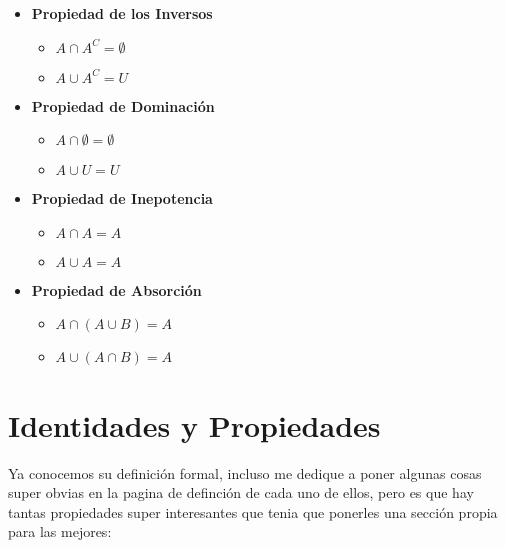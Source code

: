 \documentclass[12pt]{report}                                    %
\begin{document}
\begin{itemize}
                \item \textbf{Propiedad de los Inversos}
                    \begin{itemize}
                        \item $A \cap A^C = \emptyset$
                        \item $A \cup A^C = U$
                    \end{itemize}

                \item \textbf{Propiedad de Dominación}
                    \begin{itemize}
                        \item $A \cap \emptyset = \emptyset$
                        \item $A \cup U = U$
                    \end{itemize}

                \item \textbf{Propiedad de Inepotencia}
                    \begin{itemize}
                        \item $A \cap A = A$
                        \item $A \cup A = A$
                    \end{itemize}

                \item \textbf{Propiedad de Absorción}
                    \begin{itemize}
                        \item $A \cap (A \cup B) = A$
                        \item $A \cup (A \cap B) = A$
                    \end{itemize}

            \end{itemize}


        \clearpage
        \section{Identidades y Propiedades}
                
            Ya conocemos su definición formal, incluso me dedique a poner algunas cosas super obvias en
            la pagina de definción de cada uno de ellos, pero es que hay tantas propiedades super interesantes
            que tenia que ponerles una sección propia para las mejores:
\end{document}

